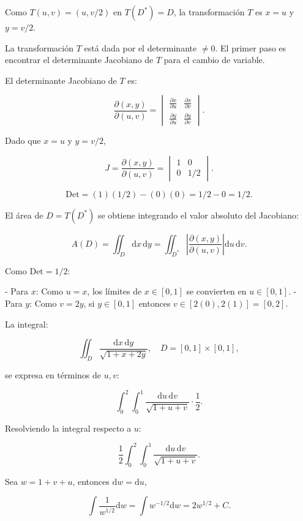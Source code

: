 Como \(T(u,v) = (u, v/2)\) en \(T(D^*) = D\), la transformación \(T\) es \(x = u\) y \(y = v/2\). 

La transformación \(T\) está dada por el determinante \( \neq 0 \). El primer paso es encontrar el determinante Jacobiano de \(T\) para el cambio de variable. 

El determinante Jacobiano de \(T\) es:

\[
\frac{\partial(x,y)}{\partial(u,v)} = 
\begin{vmatrix} 
\frac{\partial x}{\partial u} & \frac{\partial x}{\partial v} \\ 
\frac{\partial y}{\partial u} & \frac{\partial y}{\partial v} 
\end{vmatrix}.
\]

Dado que \(x = u\) y \(y = v/2\),

\[
J = \frac{\partial(x,y)}{\partial(u,v)} = 
\begin{vmatrix} 
1 & 0 \\ 
0 & 1/2 
\end{vmatrix}.
\]

\[
\text{Det} = (1)(1/2) - (0)(0) = 1/2 - 0 = 1/2.
\]

El área de \(D = T(D^*)\) se obtiene integrando el valor absoluto del Jacobiano:

\[
A(D) = \iint_D \mathrm{d}x \, \mathrm{d}y = \iint_{D^*} \left| \frac{\partial(x,y)}{\partial(u,v)} \right| \mathrm{d}u \, \mathrm{d}v.
\]

Como \(\text{Det} = 1/2\):

- Para \(x\): Como \(u = x\), los límites de \(x \in [0,1]\) se convierten en \(u \in [0,1]\).
- Para \(y\): Como \(v = 2y\), si \(y \in [0,1]\) entonces \(v \in [2(0), 2(1)] = [0,2]\).

La integral:

\[
\iint_D \frac{\mathrm{d}x \, \mathrm{d}y}{\sqrt{1+x+2y}}, \quad D = [0,1] \times [0,1],
\]

se expresa en términos de \(u, v\):

\[
\int_0^2 \int_0^1 \frac{\mathrm{d}u \, \mathrm{d}v}{\sqrt{1+u+v}} \cdot \frac{1}{2}.
\]

Resolviendo la integral respecto a \(u\):

\[
\frac{1}{2} \int_0^2 \int_0^1 \frac{\mathrm{d}u \, \mathrm{d}v}{\sqrt{1+u+v}}.
\]

Sea \(w = 1 + v + u\), entonces \(\mathrm{d}w = \mathrm{d}u\),

\[
\int \frac{1}{w^{1/2}} \mathrm{d}w = \int w^{-1/2} \mathrm{d}w = 2w^{1/2} + C.
\]

